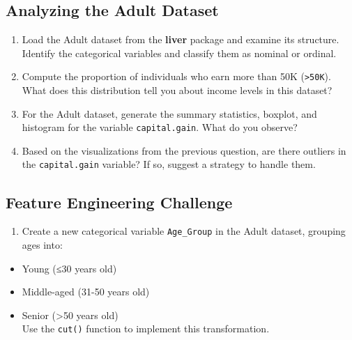 \documentclass[
  11pt,
]{book}
\providecommand{\tightlist}{%
  \setlength{\itemsep}{0pt}\setlength{\parskip}{0pt}}
\theoremstyle{definition}
\theoremstyle{definition}
\theoremstyle{definition}
\theoremstyle{definition}
\theoremstyle{remark}
\begin{document}
\subsection*{Analyzing the Adult Dataset}\label{analyzing-the-adult-dataset}


\begin{enumerate}
\def\labelenumi{\arabic{enumi}.}
\setcounter{enumi}{9}
\tightlist
\item
  Load the Adult dataset from the \textbf{liver} package and examine its structure. Identify the categorical variables and classify them as nominal or ordinal.\\
\item
  Compute the proportion of individuals who earn more than 50K (\texttt{\textgreater{}50K}). What does this distribution tell you about income levels in this dataset?\\
\item
  For the Adult dataset, generate the summary statistics, boxplot, and histogram for the variable \texttt{capital.gain}. What do you observe?\\
\item
  Based on the visualizations from the previous question, are there outliers in the \texttt{capital.gain} variable? If so, suggest a strategy to handle them.
\end{enumerate}

\subsection*{Feature Engineering Challenge}\label{feature-engineering-challenge}


\begin{enumerate}
\def\labelenumi{\arabic{enumi}.}
\setcounter{enumi}{13}
\tightlist
\item
  Create a new categorical variable \texttt{Age\_Group} in the Adult dataset, grouping ages into:\\
\end{enumerate}

\begin{itemize}
\tightlist
\item
  Young (≤30 years old)\\
\item
  Middle-aged (31-50 years old)\\
\item
  Senior (\textgreater50 years old)\\
  Use the \texttt{cut()} function to implement this transformation.
\end{itemize}
\end{document}

